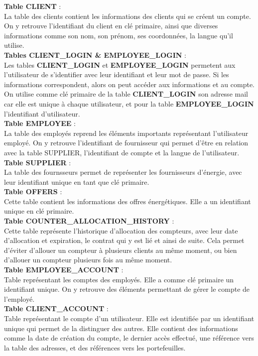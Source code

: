 \documentclass[../rapport.tex]{subfiles}
\begin{document}
\noindent \textbf{Table CLIENT} : \\ La table des clients contient les informations des clients qui se créent un compte. On y retrouve l'identifiant du client en clé primaire, ainsi que diverses informations comme son nom, son prénom, ses coordonnées, la langue qu'il utilise. 
\\
\textbf{Tables CLIENT{\_}LOGIN \& EMPLOYEE{\_}LOGIN} : \\ Les tables \textbf{CLIENT{\_}LOGIN} et \textbf{EMPLOYEE{\_}LOGIN} permetent aux l'utilisateur de s'identifier avec leur identifiant et leur mot de passe. Si les informations correspondent, alors on peut accéder aux informations et au compte. On utilise comme clé primaire de la table \textbf{CLIENT{\_}LOGIN} son adresse mail car elle est unique à chaque utilisateur, et pour la table \textbf{EMPLOYEE{\_}LOGIN} l'identifiant d'utilisateur.
\\
\textbf{Table EMPLOYEE} : \\ La table des employés reprend les éléments importants représentant l'utilisateur employé. On y retrouve l'identifiant de fournisseur qui permet d'être en relation avec la table SUPPLIER, l'identifiant de compte et la langue de l'utilisateur.
\\
\textbf{Table SUPPLIER} : \\ La table des fournsseurs permet de représenter les fournisseurs d'énergie, avec leur identifiant unique en tant que clé primaire. 
\\
\textbf{Table OFFERS} : \\ Cette table contient les informations des offres énergétiques. Elle a un identifiant unique en clé primaire.
\\
\textbf{Table COUNTER{\_}ALLOCATION{\_}HISTORY} : \\ Cette table représente l'historique d'allocation des compteurs, avec leur date d'allocation et expiration, le contrat qui y est lié et ainsi de suite. Cela permet d'éviter d'allouer un compteur à plusieurs clients au même moment, ou bien d'allouer un compteur plusieurs fois au même moment.
\\
\textbf{Table EMPLOYEE{\_}ACCOUNT} : \\ Table représentant les comptes des employés. Elle a comme clé primaire un identifiant unique. On y retrouve des éléments permettant de gérer le compte de l'employé.
\\
\textbf{Table CLIENT{\_}ACCOUNT} : \\ Table représentant le compte d'un utilisateur. Elle est identifiée par un identifiant unique qui permet de la distinguer des autres. Elle contient des informations comme la date de création du compte, le dernier accès effectué, une référence vers la table des adresses, et des références vers les portefeuilles. 
\end{document}
